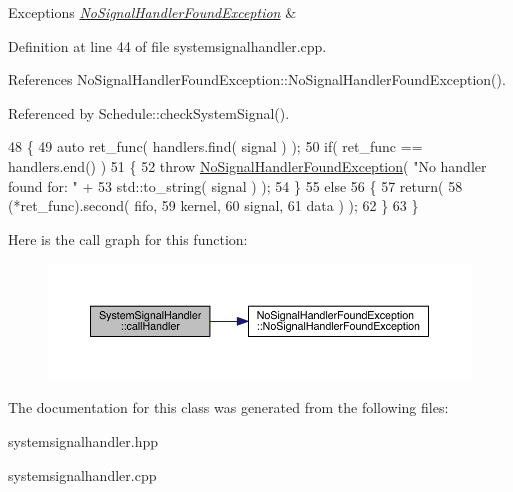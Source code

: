 \begin{DoxyExceptions}{Exceptions}
{\em \hyperlink{class_no_signal_handler_found_exception}{No\+Signal\+Handler\+Found\+Exception}} & \\
\hline
\end{DoxyExceptions}


Definition at line 44 of file systemsignalhandler.\+cpp.



References No\+Signal\+Handler\+Found\+Exception\+::\+No\+Signal\+Handler\+Found\+Exception().



Referenced by Schedule\+::check\+System\+Signal().


\begin{DoxyCode}
48 \{
49    \textcolor{keyword}{auto} ret\_func( handlers.find( signal ) );
50    \textcolor{keywordflow}{if}( ret\_func == handlers.end() )
51    \{
52       \textcolor{keywordflow}{throw} \hyperlink{class_no_signal_handler_found_exception}{NoSignalHandlerFoundException}( \textcolor{stringliteral}{"No handler found for: "} +
53                                              std::to\_string( signal ) );
54    \}
55    \textcolor{keywordflow}{else}
56    \{
57       \textcolor{keywordflow}{return}( 
58       (*ret\_func).second( fifo,
59                           kernel,                         
60                           signal, 
61                           data ) ); 
62    \}
63 \}
\end{DoxyCode}
Here is the call graph for this function\+:
\nopagebreak
\begin{figure}[H]
\begin{center}
\leavevmode
\includegraphics[width=350pt]{class_system_signal_handler_ac66db8af116e4f887706e58acb0781bb_cgraph}
\end{center}
\end{figure}


The documentation for this class was generated from the following files\+:\begin{DoxyCompactItemize}
\item 
systemsignalhandler.\+hpp\item 
systemsignalhandler.\+cpp\end{DoxyCompactItemize}
